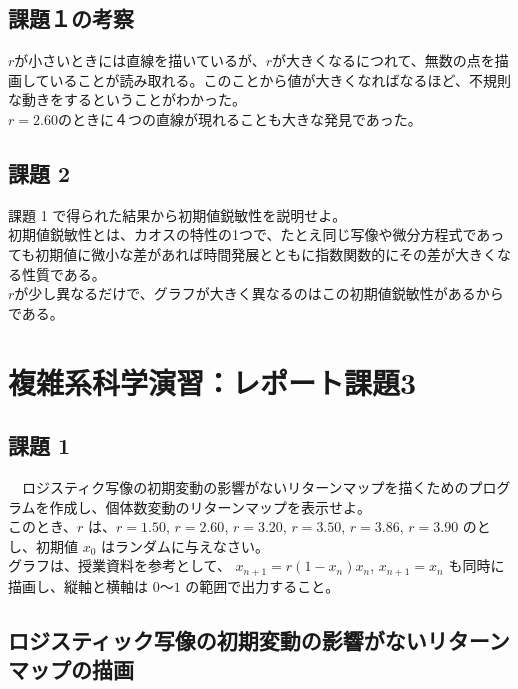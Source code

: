 \documentclass[a4j]{jsarticle}
\begin{document}
\subsection{課題１の考察}
$r$が小さいときには直線を描いているが、$r$が大きくなるにつれて、無数の点を描画していることが読み取れる。このことから値が大きくなればなるほど、不規則な動きをするということがわかった。\\
$r = 2.60$のときに４つの直線が現れることも大きな発見であった。\\

\subsection{課題 2}
  課題 1 で得られた結果から初期値鋭敏性を説明せよ。\\


初期値鋭敏性とは、カオスの特性の1つで、たとえ同じ写像や微分方程式であっても初期値に微小な差があれば時間発展とともに指数関数的にその差が大きくなる性質である。\\
$r$が少し異なるだけで、グラフが大きく異なるのはこの初期値鋭敏性があるからである。\\

\newpage

\section{複雑系科学演習：レポート課題3}

\subsection{課題 1}
　ロジスティク写像の初期変動の影響がないリターンマップを描くためのプログラムを作成し、個体数変動のリターンマップを表示せよ。\\
このとき、$r$ は、$r = 1.50$, $r = 2.60$, $r = 3.20$, $r = 3.50$, $r = 3.86$, $r = 3.90$ のとし、初期値 $x_{0}$ はランダムに与えなさい。\\
グラフは、授業資料を参考として、 $x_{n+1} = r(1 − x_{n})x_{n}$, $x_{n+1} = x_{n}$ も同時に描画し、縦軸と横軸は $0$～$1$ の範囲で出力すること。\\

\newpage

\subsection{ロジスティック写像の初期変動の影響がないリターンマップの描画}
\end{document}
